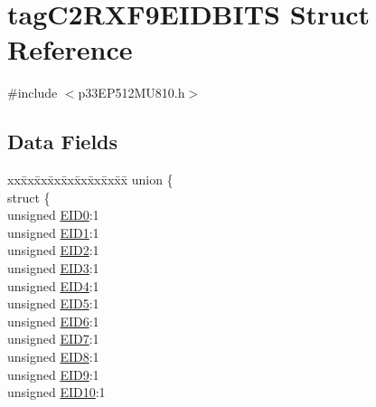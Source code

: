 \hypertarget{structtag_c2_r_x_f9_e_i_d_b_i_t_s}{}\section{tag\+C2\+R\+X\+F9\+E\+I\+D\+B\+I\+TS Struct Reference}
\label{structtag_c2_r_x_f9_e_i_d_b_i_t_s}


{\ttfamily \#include $<$p33\+E\+P512\+M\+U810.\+h$>$}

\subsection*{Data Fields}
\begin{DoxyCompactItemize}
\item 
\begin{tabbing}
xx\=xx\=xx\=xx\=xx\=xx\=xx\=xx\=xx\=\kill
union \{\\
\>struct \{\\
\>\>unsigned \hyperlink{structtag_c2_r_x_f9_e_i_d_b_i_t_s_a9da8b7b30247e4f9cd8cc056549aa9fd}{EID0}:1\\
\>\>unsigned \hyperlink{structtag_c2_r_x_f9_e_i_d_b_i_t_s_afd6c139491d147c1262f3d051c6691e9}{EID1}:1\\
\>\>unsigned \hyperlink{structtag_c2_r_x_f9_e_i_d_b_i_t_s_a36ec62d8d3c5acd5d15e6691dc099a94}{EID2}:1\\
\>\>unsigned \hyperlink{structtag_c2_r_x_f9_e_i_d_b_i_t_s_ab895f7d0ac289a0383b607cbc62eebe2}{EID3}:1\\
\>\>unsigned \hyperlink{structtag_c2_r_x_f9_e_i_d_b_i_t_s_a136d5a709d6618d40acceccb43036656}{EID4}:1\\
\>\>unsigned \hyperlink{structtag_c2_r_x_f9_e_i_d_b_i_t_s_a8dffb2d86a6c184df505ae7c71a58710}{EID5}:1\\
\>\>unsigned \hyperlink{structtag_c2_r_x_f9_e_i_d_b_i_t_s_af8a8574102515d8f1a4b7fd1685d0532}{EID6}:1\\
\>\>unsigned \hyperlink{structtag_c2_r_x_f9_e_i_d_b_i_t_s_a84c3262e67f8d5fd387ac10bde6fa9b1}{EID7}:1\\
\>\>unsigned \hyperlink{structtag_c2_r_x_f9_e_i_d_b_i_t_s_acca25e0b7d86eb499d01f85222baea87}{EID8}:1\\
\>\>unsigned \hyperlink{structtag_c2_r_x_f9_e_i_d_b_i_t_s_ac6748f73d4ada8538b06548be4f396c2}{EID9}:1\\
\>\>unsigned \hyperlink{structtag_c2_r_x_f9_e_i_d_b_i_t_s_a9cea8e77ecbb72bd3b08102412793725}{EID10}:1\\

\end{tabbing}
\end{DoxyCompactItemize}
